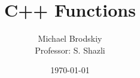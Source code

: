 


\def\code#1{\texttt{#1}}

\pagestyle{fancy}

\title{C++ Functions}
\date{\today}
\author{Michael Brodskiy\\ \small Professor: S. Shazli}



\maketitle

\thispagestyle{fancy}

\newpage

